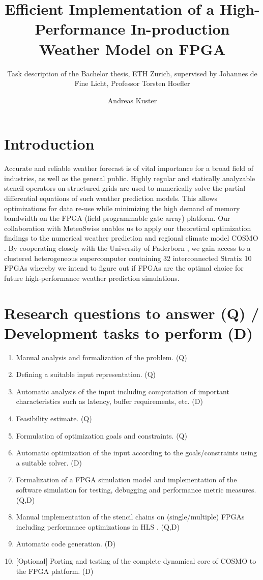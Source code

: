 \documentclass{scrartcl}
\title{Efficient Implementation of a High-Performance In-production Weather Model on FPGA}
\subtitle{Task description of the Bachelor thesis, ETH Zurich, supervised by Johannes de Fine Licht, Professor Torsten Hoefler}
\author{Andreas Kuster}
\date{}
\begin{document}
\maketitle

\section*{Introduction}
Accurate and reliable weather forecast is of vital importance for a broad field of industries, as well as the general public. Highly regular and statically analyzable stencil operators \cite{label6} on structured grids  are used to numerically solve the partial differential equations of such weather prediction models. This allows optimizations for data re-use while minimizing the high demand of memory bandwidth \cite{label2,label5} on the FPGA (field-programmable gate array) platform. Our collaboration with MeteoSwiss \cite{label37} enables us to apply our theoretical optimization findings to the numerical weather prediction and regional climate model COSMO \cite{label15, label38}. By cooperating closely with the University of Paderborn \cite{label42}, we gain access to a clustered heterogeneous supercomputer containing 32 interconnected Stratix 10 FPGAs  \cite{label26} whereby we intend to figure out if FPGAs \cite{label33} are the optimal choice for future high-performance weather prediction simulations.

\section*{Research questions to answer (Q) / Development tasks to perform (D)}
\begin{enumerate}
    \item Manual analysis and formalization of the problem. (Q)
    \item Defining a suitable input representation. (Q)
    \item Automatic analysis of the input including computation of important characteristics such as latency, buffer requirements, etc. (D)
    \item Feasibility estimate. (Q)
    \item Formulation of optimization goals and constraints. (Q)
    \item Automatic optimization of the input according to the goals/constraints using a suitable solver. (D)
    \item Formalization of a FPGA simulation model and implementation of the software simulation for testing, debugging and performance metric measures. (Q,D)
    \item Manual implementation of the stencil chains on (single/multiple) FPGAs including performance optimizations in HLS \cite{label18}. (Q,D)
    \item Automatic code generation. (D)
    \item $[$Optional$]$ Porting and testing of the complete dynamical core of COSMO to the FPGA platform. (D)
\end{enumerate}
\end{document}

